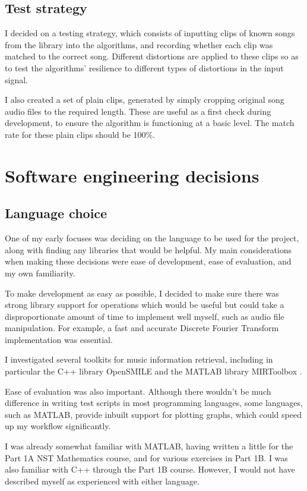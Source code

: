 \documentclass[12pt,a4paper,twoside,openright]{report}
\begin{document}
\subsection{Test strategy}

I decided on a testing strategy, which consists of inputting clips of known songs from the library into the algorithms, and recording whether each clip was matched to the correct song. Different distortions are applied to these clips so as to test the algorithms' resilience to different types of distortions in the input signal.

I also created a set of plain clips, generated by simply cropping original song audio files to the required length. These are useful as a first check during development, to ensure the algorithm is functioning at a basic level. The match rate for these plain clips should be 100\%.


\section{Software engineering decisions}

\subsection{Language choice}

One of my early focuses was deciding on the language to be used for the project, along with finding any libraries that would be helpful. My main considerations when making these decisions were ease of development, ease of evaluation, and my own familiarity.

To make development as easy as possible, I decided to make sure there was strong library support for operations which would be useful but could take a disproportionate amount of time to implement well myself, such as audio file manipulation. For example, a fast and accurate Discrete Fourier Transform implementation was essential.

I investigated several toolkits for music information retrieval, including in particular the C++ library OpenSMILE \cite{Eyben10} and the MATLAB library MIRToolbox \cite{Lartillot07}.

Ease of evaluation was also important. Although there wouldn't be much difference in writing test scripts in most programming languages, some languages, such as MATLAB, provide inbuilt support for plotting graphs, which could speed up my workflow significantly.

I was already somewhat familiar with MATLAB, having written a little for the Part 1A NST Mathematics course, and for various exercises in Part 1B. I was also familiar with C++ through the Part 1B course. However, I would not have described myself as experienced with either language.
\end{document}

